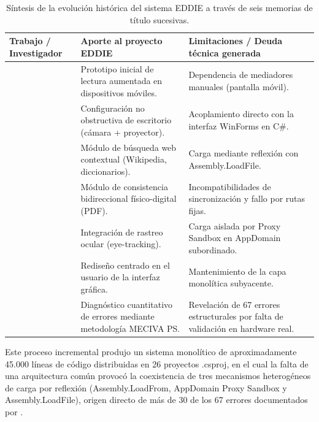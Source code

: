 \begin{table}[H]
    \centering
    \caption{Síntesis de la evolución histórica del sistema EDDIE a través de seis memorias de título sucesivas.}
    \label{tab:evolucion_eddie}
    \small
    \begin{tabularx}{\textwidth}{>{\raggedright\arraybackslash}p{3.0cm} >{\raggedright\arraybackslash}X >{\raggedright\arraybackslash}X}
        \toprule
        Trabajo / Investigador & Aporte al proyecto EDDIE & Limitaciones / Deuda técnica generada \\ \midrule
        \cite{carrasco2017diseno} & Prototipo inicial de lectura aumentada en dispositivos móviles. & Dependencia de mediadores manuales (pantalla móvil). \\ \midrule
        \cite{contreras2019desarrollo} & Configuración no obstructiva de escritorio (cámara + proyector). & Acoplamiento directo con la interfaz WinForms en C\#. \\ \midrule
        \cite{montanares2019desarrollo} & Módulo de búsqueda web contextual (Wikipedia, diccionarios). & Carga mediante reflexión con Assembly.LoadFile. \\ \midrule
        \cite{pezoa2020implementacion} & Módulo de consistencia bidireccional físico-digital (PDF). & Incompatibilidades de sincronización y fallo por rutas fijas. \\ \midrule
        \cite{estay2020integracion} & Integración de rastreo ocular (eye-tracking). & Carga aislada por Proxy Sandbox en AppDomain subordinado. \\ \midrule
        \cite{santibanez2020rediseno} & Rediseño centrado en el usuario de la interfaz gráfica. & Mantenimiento de la capa monolítica subyacente. \\ \midrule
        \cite{ibaceta2023evaluacion} & Diagnóstico cuantitativo de errores mediante metodología MECIVA PS. & Revelación de 67 errores estructurales por falta de validación en hardware real. \\ \bottomrule
    \end{tabularx}
\end{table}

Este proceso incremental produjo un sistema monolítico de aproximadamente 45.000 líneas de código distribuidas en 26 proyectos .csproj, en el cual la falta de una arquitectura común provocó la coexistencia de tres mecanismos heterogéneos de carga por reflexión (Assembly.LoadFrom, AppDomain Proxy Sandbox y Assembly.LoadFile), origen directo de más de 30 de los 67 errores documentados por \cite{ibaceta2023evaluacion}.

